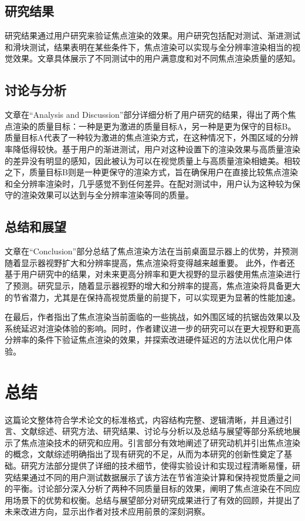 \documentclass{ctexart}
\begin{document}
		\subsection{研究结果}
		研究结果通过用户研究来验证焦点渲染的效果。用户研究包括配对测试、渐进测试和滑块测试，结果表明在某些条件下，焦点渲染可以实现与全分辨率渲染相当的视觉效果。文章具体展示了不同测试中的用户满意度和对不同焦点渲染质量的感知​。
		\subsection{讨论与分析}
		文章在“Analysis and Discussion”部分详细分析了用户研究的结果，得出了两个焦点渲染的质量目标：一种是更为激进的质量目标A，另一种是更为保守的目标B。质量目标A代表了一种较为激进的焦点渲染方式，在这种情况下，外围区域的分辨率降低得较快。基于用户的渐进测试，用户对这种设置下的渲染效果与高质量渲染的差异没有明显的感知，因此被认为可以在视觉质量上与高质量渲染相媲美。相较之下，质量目标B则是一种更保守的渲染方式，旨在确保用户在直接比较焦点渲染和全分辨率渲染时，几乎感觉不到任何差异。在配对测试中，用户认为这种较为保守的渲染效果可以达到与全分辨率渲染等同的质量。
		\subsection{总结和展望}
		文章在“Conclusion”部分总结了焦点渲染方法在当前桌面显示器上的优势，并预测随着显示器视野扩大和分辨率提高，焦点渲染将变得越来越重要。
		此外，作者还基于用户研究中的结果，对未来更高分辨率和更大视野的显示器使用焦点渲染进行了预测。研究显示，随着显示器视野的增大和分辨率的提高，焦点渲染将具备更大的节省潜力，尤其是在保持高视觉质量的前提下，可以实现更为显著的性能加速。
		
		在最后，作者指出了焦点渲染当前面临的一些挑战，如外围区域的抗锯齿效果以及系统延迟对渲染体验的影响。同时，作者建议进一步的研究可以在更大视野和更高分辨率的条件下验证焦点渲染的效果，并探索改进硬件延迟的方法以优化用户体验。
		
	\section{总结}
		这篇论文整体符合学术论文的标准格式，内容结构完整、逻辑清晰，并且通过引言、文献综述、研究方法、研究结果、讨论与分析以及总结与展望等部分系统地展示了焦点渲染技术的研究和应用。引言部分有效地阐述了研究动机并引出焦点渲染的概念，文献综述明确指出了现有研究的不足，从而为本研究的创新性奠定了基础。研究方法部分提供了详细的技术细节，使得实验设计和实现过程清晰易懂，研究结果通过不同的用户测试数据展示了该方法在节省渲染计算和保持视觉质量之间的平衡。讨论部分深入分析了两种不同质量目标的效果，阐明了焦点渲染在不同应用场景下的优势和权衡。总结与展望部分对研究成果进行了有效的回顾，并提出了未来改进方向，显示出作者对技术应用前景的深刻洞察。
	
	
\end{document}
